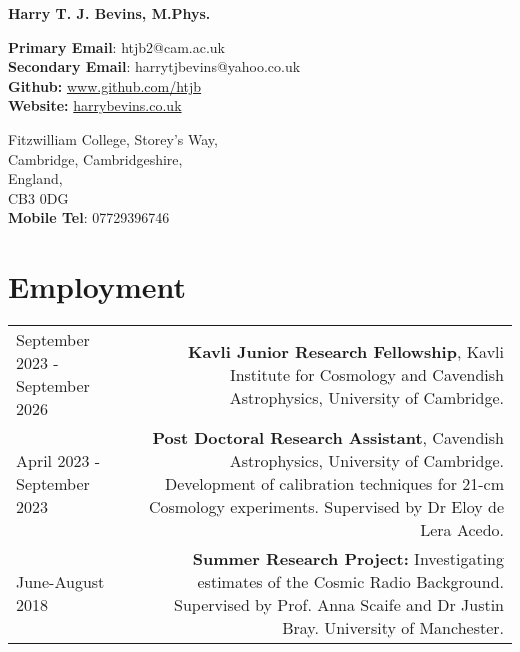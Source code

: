 \documentclass{article}
\begin{document}
\small

\begin{center}
\huge
\textbf{Harry T. J. Bevins, M.Phys.}
\end{center}

\begin{minipage}[ht]{0.6\linewidth}
	\textbf{Primary Email}: htjb2@cam.ac.uk \\
	\textbf{Secondary Email}: harrytjbevins@yahoo.co.uk \\
	\textbf{Github:} \url{www.github.com/htjb}\\
	\textbf{Website:} \url{harrybevins.co.uk}
\end{minipage}
\begin{minipage}[ht]{0.3\linewidth}
	\begin{flushright}
	Fitzwilliam College, Storey's Way,\\
	Cambridge, Cambridgeshire,\\
	England,\\
	CB3 0DG \\
    \textbf{Mobile Tel}: 07729396746 \\
	\end{flushright}
\end{minipage}

\section*{Employment}
\begin{tabular}{L!{\vrule}R}
    September 2023 - September 2026 & \textbf{Kavli Junior Research Fellowship}, Kavli Institute for Cosmology and Cavendish Astrophysics, University of Cambridge. \\
    April 2023 - September 2023 & \textbf{Post Doctoral Research Assistant}, Cavendish Astrophysics, University of Cambridge. Development of calibration techniques for 21-cm Cosmology experiments. Supervised by Dr Eloy de Lera Acedo.\\
    June-August 2018 & \textbf{Summer Research Project:} Investigating estimates of the Cosmic Radio Background. Supervised by Prof. Anna Scaife and Dr Justin Bray. University of Manchester. \\
\end{tabular}
\end{document}
